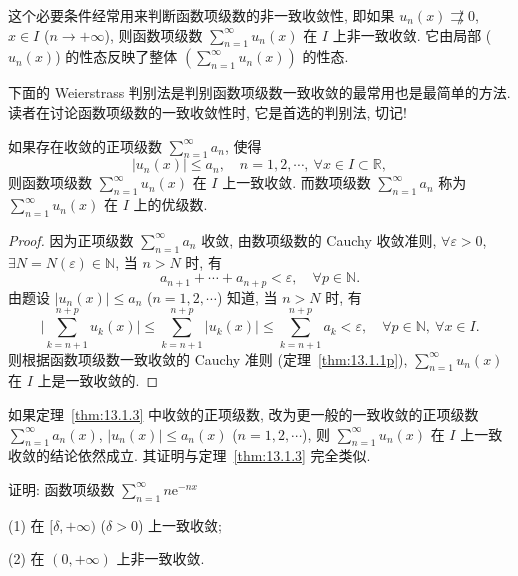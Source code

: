 这个必要条件经常用来判断函数项级数的非一致收敛性, 即如果 $u_{n}(x)\not\rightrightarrows0$, $x\in I$ ($n\to+\infty$), 则函数项级数 $\sum_{n=1}^{\infty}u_{n}(x)$ 在 $I$ 上非一致收敛. 它由局部 ($u_{n}(x)$) 的性态反映了整体 $\left(\sum_{n=1}^{\infty}u_{n}(x)\right)$ 的性态.

下面的 Weierstrass 判别法是判别函数项级数一致收敛的最常用也是最简单的方法. 读者在讨论函数项级数的一致收敛性时, 它是首选的判别法, 切记!

\begin{theorem}\label{thm:13.1.3}
如果存在收敛的正项级数 $\sum_{n=1}^{\infty}a_{n}$, 使得
\[
  |u_{n}(x)|\leqslant a_{n},\quad n=1,2,\cdots,\ \forall x\in I\subset\mathbb{R},
\]
则函数项级数 $\sum_{n=1}^{\infty}u_{n}(x)$ 在 $I$ 上一致收敛. 而数项级数 $\sum_{n=1}^{\infty}a_{n}$ 称为 $\sum_{n=1}^{\infty}u_{n}(x)$ 在 $I$ 上的优级数.
\end{theorem}

\begin{proof}
因为正项级数 $\sum_{n=1}^{\infty}a_{n}$ 收敛, 由数项级数的 Cauchy 收敛准则, $\forall\varepsilon>0$, $\exists N=N(\varepsilon)\in\mathbb{N}$, 当 $n>N$ 时, 有
\[
  a_{n+1}+\cdots+a_{n+p}<\varepsilon,\quad\forall p\in\mathbb{N}.
\]
由题设 $|u_{n}(x)|\leqslant a_{n}$ ($n=1,2,\cdots$) 知道, 当 $n>N$ 时, 有
\[
  \Big|\sum_{k=n+1}^{n+p}u_{k}(x)\Big|\leqslant\sum_{k=n+1}^{n+p}|u_{k}(x)|\leqslant\sum_{k=n+1}^{n+p}a_{k}<\varepsilon,\quad\forall p\in\mathbb{N},\ \forall x\in I.
\]
则根据函数项级数一致收敛的 Cauchy 准则 (定理~\ref{thm:13.1.1p}), $\sum_{n=1}^{\infty}u_{n}(x)$ 在 $I$ 上是一致收敛的.
\end{proof}

\begin{remark}\label{rem:13.1.1}
如果定理~\ref{thm:13.1.3} 中收敛的正项级数, 改为更一般的一致收敛的正项级数 $\sum_{n=1}^{\infty}a_{n}(x)$, $|u_{n}(x)|\leqslant a_{n}(x)$ ($n=1,2,\cdots$), 则 $\sum_{n=1}^{\infty}u_{n}(x)$ 在 $I$ 上一致收敛的结论依然成立. 其证明与定理~\ref{thm:13.1.3} 完全类似.
\end{remark}

\begin{example}\label{ex:13.1.13}
证明: 函数项级数 $\sum_{n=1}^{\infty}n\mathrm{e}^{-nx}$

(1) 在 $[\delta,+\infty)$ ($\delta>0$) 上一致收敛;

(2) 在 $(0,+\infty)$ 上非一致收敛.
\end{example}

